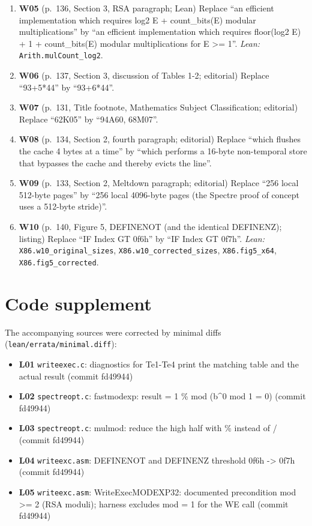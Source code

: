 \documentclass[10pt,twocolumn]{article}
\begin{document}
\begin{enumerate}[label=]
\item \textbf{W05} (p.~136, Section 3, RSA paragraph; Lean) Replace ``an efficient implementation which requires log2 E + count\_bits(E) modular multiplications'' by ``an efficient implementation which requires floor(log2 E) + 1 + count\_bits(E) modular multiplications for E >= 1''. \emph{Lean:} \texttt{Arith.mulCount\_log2}.
\item \textbf{W06} (p.~137, Section 3, discussion of Tables 1-2; editorial) Replace ``93+5*44'' by ``93+6*44''.
\item \textbf{W07} (p.~131, Title footnote, Mathematics Subject Classification; editorial) Replace ``62K05'' by ``94A60, 68M07''.
\item \textbf{W08} (p.~134, Section 2, fourth paragraph; editorial) Replace ``which flushes the cache 4 bytes at a time'' by ``which performs a 16-byte non-temporal store that bypasses the cache and thereby evicts the line''.
\item \textbf{W09} (p.~133, Section 2, Meltdown paragraph; editorial) Replace ``256 local 512-byte pages'' by ``256 local 4096-byte pages (the Spectre proof of concept uses a 512-byte stride)''.
\item \textbf{W10} (p.~140, Figure 5, DEFINENOT (and the identical DEFINENZ); listing) Replace ``IF Index GT 0f6h'' by ``IF Index GT 0f7h''. \emph{Lean:} \texttt{X86.w10\_original\_sizes}, \texttt{X86.w10\_corrected\_sizes}, \texttt{X86.fig5\_x64}, \texttt{X86.fig5\_corrected}.
\end{enumerate}
\section*{Code supplement}
The accompanying sources were corrected by minimal diffs (\texttt{lean/errata/minimal.diff}):
\begin{itemize}
\item \textbf{L01} \texttt{writeexec.c}: diagnostics for Te1-Te4 print the matching table and the actual result (commit fd49944)
\item \textbf{L02} \texttt{spectreopt.c}: fastmodexp: result = 1 \% mod (b\^{}0 mod 1 = 0) (commit fd49944)
\item \textbf{L03} \texttt{spectreopt.c}: mulmod: reduce the high half with \% instead of / (commit fd49944)
\item \textbf{L04} \texttt{writeexc.asm}: DEFINENOT and DEFINENZ threshold 0f6h -> 0f7h (commit fd49944)
\item \textbf{L05} \texttt{writeexc.asm}: WriteExecMODEXP32: documented precondition mod >= 2 (RSA moduli); harness excludes mod = 1 for the WE call (commit fd49944)
\end{itemize}
\end{document}
